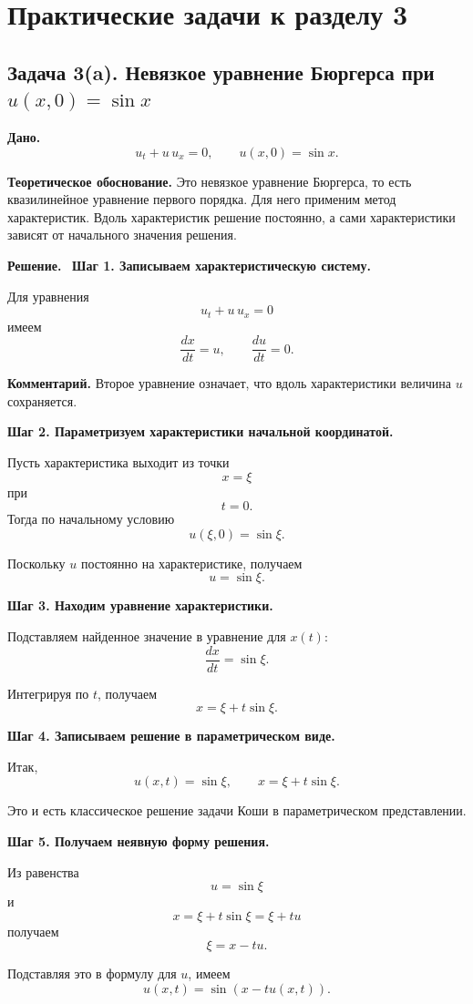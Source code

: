 \documentclass[a4paper,12pt]{article}
\newcommand{\Solution}{\textbf{Решение.}\ }
\begin{document}
\section*{Практические задачи к разделу 3}

\subsection*{Задача 3(a). Невязкое уравнение Бюргерса при \texorpdfstring{$u(x,0)=\sin x$}{u(x,0)=sin x}}

\textbf{Дано.}
\[
u_t+u\,u_x=0,
\qquad
u(x,0)=\sin x.
\]

\textbf{Теоретическое обоснование.}
Это невязкое уравнение Бюргерса, то есть квазилинейное уравнение первого порядка. Для него применим метод характеристик. Вдоль характеристик решение постоянно, а сами характеристики зависят от начального значения решения.

\Solution
\textbf{Шаг 1. Записываем характеристическую систему.}

Для уравнения
\[
u_t+u\,u_x=0
\]
имеем
\[
\frac{dx}{dt}=u,
\qquad
\frac{du}{dt}=0.
\]

\textbf{Комментарий.} Второе уравнение означает, что вдоль характеристики величина $u$ сохраняется.

\textbf{Шаг 2. Параметризуем характеристики начальной координатой.}

Пусть характеристика выходит из точки
\[
x=\xi
\]
при
\[
t=0.
\]
Тогда по начальному условию
\[
u(\xi,0)=\sin \xi.
\]

Поскольку $u$ постоянно на характеристике, получаем
\[
u=\sin \xi.
\]

\textbf{Шаг 3. Находим уравнение характеристики.}

Подставляем найденное значение в уравнение для $x(t)$:
\[
\frac{dx}{dt}=\sin \xi.
\]

Интегрируя по $t$, получаем
\[
x=\xi+t\sin \xi.
\]

\textbf{Шаг 4. Записываем решение в параметрическом виде.}

Итак,
\[
u(x,t)=\sin \xi,
\qquad
x=\xi+t\sin \xi.
\]

Это и есть классическое решение задачи Коши в параметрическом представлении.

\textbf{Шаг 5. Получаем неявную форму решения.}

Из равенства
\[
u=\sin \xi
\]
и
\[
x=\xi+t\sin \xi=\xi+t u
\]
получаем
\[
\xi=x-tu.
\]

Подставляя это в формулу для $u$, имеем
\[
u(x,t)=\sin(x-tu(x,t)).
\]
\end{document}
